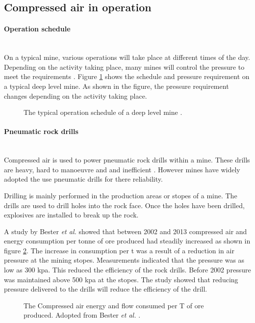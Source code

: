 \subsection{Compressed air in operation}
	\paragraph{Operation schedule}\leavevmode\\
	On a typical mine, various operations will take place at different times of the day. Depending on the activity taking place, many mines will control the pressure to meet the requirements \cite{Kriel2014Masters,Marais2012PhD}. Figure \ref{fig: Mining schedule} shows the schedule and pressure requirement on a typical deep level mine. As shown in the figure, the pressure requirement changes depending on the activity taking place.
		\begin{figure}[h]
		\centering
		\fbox{}
		\caption[A typical operation schedule of a deep level mine.]{The typical operation schedule of a deep level mine \cite{Kriel2014Masters}.}
		\label{fig: Mining schedule}
	\end{figure}
	\paragraph*{Pneumatic rock drills}\leavevmode\\
	Compressed air is used to power pneumatic rock drills within a mine. These drills are heavy, hard to manoeuvre and  and inefficient \cite{van2008development}. However mines have widely adopted the use pneumatic drills for there reliability. \par
	Drilling is mainly performed in the production areas or stopes of a mine. The drills are used to drill holes into the rock face. Once the holes have been drilled, explosives are installed to break up the rock.\par
	A study by  Bester \textit{et al.} showed that between 2002 and 2013 compressed air and energy consumption per tonne of ore produced had steadily increased as shown in figure \ref{fig: Compressed energy and air flow per ton}. The increase in consumption per \gls{t} was a result of a reduction in air pressure at the mining stopes. Measurements indicated that the pressure was as low as 300 \gls{kpa}. This reduced the efficiency of the rock drills. Before 2002 pressure was maintained above 500 \gls{kpa} at the stopes.  The study showed that reducing pressure delivered to the drills will reduce the efficiency of the drill.\cite{bester2013effect} \par
		\begin{figure}[h]
		\centering
		\fbox{}
		\caption[The Compressed air energy and flow consumed per T of ore produced.]{The Compressed air energy and flow consumed per T of ore produced. Adopted from Bester \textit{et al.} \cite{bester2013effect}.}
		\label{fig: Compressed energy and air flow per ton}
	\end{figure}

